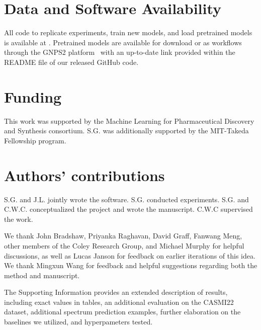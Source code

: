 \documentclass[journal=jcim,manuscript=article]{achemso}
\begin{document}
\section{Data and Software Availability}
All code to replicate experiments, train new models, and load pretrained models is available at \codeUrl{}. Pretrained models are available for download or as workflows through the GNPS2 platform~\cite{wang_sharing_2016} with an up-to-date link provided within the README file of our released GitHub code. %


\section{Funding}
This work was supported by the Machine Learning for Pharmaceutical Discovery and Synthesis consortium. S.G. was additionally supported by the MIT-Takeda Fellowship program. 

\section{Authors' contributions}
S.G. and J.L. jointly wrote the software. S.G. conducted experiments. S.G. and C.W.C. conceptualized the project and wrote the manuscript. C.W.C supervised the work. 

\begin{acknowledgement}
We thank John Bradshaw, Priyanka Raghavan, David Graff, Fanwang Meng, other members of the Coley Research Group, and Michael Murphy for helpful discussions, as well as Lucas Janson for feedback on earlier iterations of this idea. We thank Mingxun Wang for feedback and helpful suggestions regarding both the method and manuscript.

\end{acknowledgement}


\begin{suppinfo}
The Supporting Information provides an extended description of results, including exact values in tables, an additional evaluation on the CASMI22 dataset, additional spectrum prediction examples, further elaboration on the baselines we utilized, and hyperpameters tested. %
\end{suppinfo}


\end{document}
